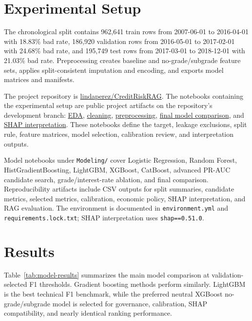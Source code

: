 \documentclass[11pt]{article}
\begin{document}
\section{Experimental Setup}
The chronological split contains 962,641 train rows from 2007-06-01 to 2016-04-01 with 18.83\% bad rate, 186,920 validation rows from 2016-05-01 to 2017-02-01 with 24.68\% bad rate, and 195,749 test rows from 2017-03-01 to 2018-12-01 with 21.03\% bad rate. Preprocessing creates baseline and no-grade/subgrade feature sets, applies split-consistent imputation and encoding, and exports model matrices and manifests.

The project repository is \href{https://github.com/lindaperez/CreditRiskRAG}{lindaperez/CreditRiskRAG}. The notebooks containing the experimental setup are public project artifacts on the repository's development branch: \href{https://github.com/lindaperez/CreditRiskRAG/blob/dev/EDA/Accepted_Loan_EDA.ipynb}{EDA}, \href{https://github.com/lindaperez/CreditRiskRAG/blob/dev/Cleaning/Accepted_Loan_Cleaning.ipynb}{cleaning}, \href{https://github.com/lindaperez/CreditRiskRAG/blob/dev/Modeling/Preprocessing/0_Preprocessing.ipynb}{preprocessing}, \href{https://github.com/lindaperez/CreditRiskRAG/blob/dev/Modeling/9_Final_Model_Comparison.ipynb}{final model comparison}, and \href{https://github.com/lindaperez/CreditRiskRAG/blob/dev/Interpretation_SHAP/1_SHAP_Interpretation.ipynb}{SHAP interpretation}. These notebooks define the target, leakage exclusions, split rule, feature matrices, model selection, calibration review, and interpretation outputs.

Model notebooks under \texttt{Modeling/} cover Logistic Regression, Random Forest, HistGradientBoosting, LightGBM, XGBoost, CatBoost, advanced PR-AUC candidate search, grade/interest-rate ablation, and final comparison. Reproducibility artifacts include CSV outputs for split summaries, candidate metrics, selected metrics, calibration, economic policy, SHAP interpretation, and RAG evaluation. The environment is documented in \texttt{environment.yml} and \texttt{requirements.lock.txt}; SHAP interpretation uses \texttt{shap==0.51.0}.

\section{Results}
Table~\ref{tab:model-results} summarizes the main model comparison at validation-selected F1 thresholds. Gradient boosting methods perform similarly. LightGBM is the best technical F1 benchmark, while the preferred neutral XGBoost no-grade/subgrade model is selected for governance, calibration, SHAP compatibility, and nearly identical ranking performance.
\end{document}
